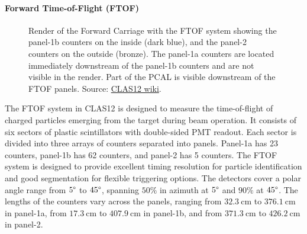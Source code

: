 \paragraph{Forward Time-of-Flight (FTOF)}
\label{par::ftof}
    \begin{figure}
        \centering{}
        \caption[FTOF]{Render of the Forward Carriage with the FTOF system showing the panel-1b counters on the inside (dark blue), and the panel-2 counters on the outside (bronze).
        The panel-1a counters are located immediately downstream of the panel-1b counters and are not visible in the render.
        Part of the PCAL is visible downstream of the FTOF panels.
        Source: \hyperlink{https://www.jlab.org/physics/hall-b/clas12}{CLAS12 wiki}.}
        \label{fig::ftof}
    \end{figure}

    The FTOF system in CLAS12 is designed to measure the time-of-flight of charged particles emerging from the target during beam operation.
    It consists of six sectors of plastic scintillators with double-sided PMT readout.
    Each sector is divided into three arrays of counters separated into panels.
    Panel-1a has 23 counters, panel-1b has 62 counters, and panel-2 has 5 counters.
    The FTOF system is designed to provide excellent timing resolution for particle identification and good segmentation for flexible triggering options.
    The detectors cover a polar angle range from $5\degree$ to $45\degree$, spanning $50\%$ in azimuth at $5\degree$ and $90\%$ at $45\degree$.
    The lengths of the counters vary across the panels, ranging from $32.3 ~\text{cm}$ to $376.1 ~\text{cm}$ in panel-1a, from $17.3 ~\text{cm}$ to $407.9 ~\text{cm}$ in panel-1b, and from $371.3 ~\text{cm}$ to $426.2 ~\text{cm}$ in panel-2.


